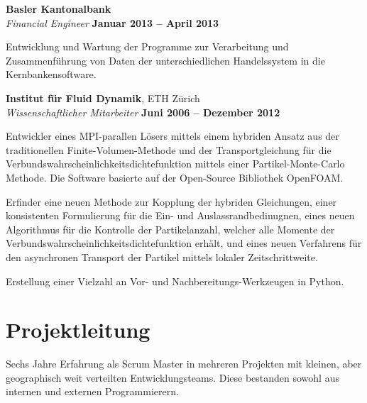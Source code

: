 \documentclass[line,11pt,a4paper]{../resume}
\begin{document}
\begin{resume}
\textbf{Basler Kantonalbank} \vspace{2mm}\\\vspace{1mm}%
\textsl{Financial Engineer} \hfill \textbf{Januar 2013 -- April 2013}\\
\begin{list2}
  \item Entwicklung und Wartung der Programme zur Verarbeitung und
    Zusammenführung von Daten der unterschiedlichen Handelssystem in die
    Kernbankensoftware.
\end{list2}

\textbf{Institut für Fluid Dynamik}, ETH Zürich \vspace{2mm}\\\vspace{1mm}%
\textsl{Wissenschaftlicher Mitarbeiter} \hfill \textbf{Juni 2006 -- Dezember 2012}\\
\begin{list2}
  \item Entwickler eines MPI-parallen Lösers mittels einem hybriden Ansatz aus
    der traditionellen Finite-Volumen-Methode und der Transportgleichung für
    die Verbundswahrscheinlichkeitsdichtefunktion mittels einer
    Partikel-Monte-Carlo Methode. Die Software basierte auf der Open-Source
    Bibliothek OpenFOAM.

  \item Erfinder eine neuen Methode zur Kopplung der hybriden Gleichungen,
    einer konsistenten Formulierung für die Ein- und Auslassrandbedinugnen,
    eines neuen Algorithmus für die Kontrolle der Partikelanzahl, welcher alle
    Momente der Verbundswahrscheinlichkeitsdichtefunktion erhält, und eines
    neuen Verfahrens für den asynchronen Transport der Partikel mittels lokaler
    Zeitschrittweite.

  \item Erstellung einer Vielzahl an Vor- und Nachbereitungs-Werkzeugen in
    Python.
\end{list2}

\section{\mysidestyle Projektleitung}\vspace{6mm}
\begin{list2}
  \item Sechs Jahre Erfahrung als Scrum Master in mehreren Projekten mit
    kleinen, aber geographisch weit verteilten Entwicklungsteams. Diese
    bestanden sowohl aus internen und externen Programmierern.


\end{list2}
\end{resume}
\end{document}
